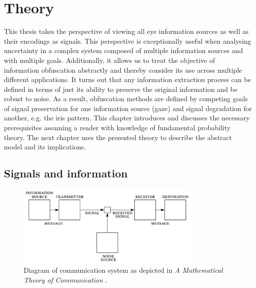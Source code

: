 \chapter{Theory}
This thesis takes the perspective of viewing all eye information sources as well as their encodings as signals. This perspective is exceptionally useful when analysing uncertainty in a complex system composed of multiple information sources and with multiple goals. Additionally, it allows us to treat the objective of information obfuscation abstractly and thereby consider its use across multiple different applications. It turns out that any information extraction process can be defined in terms of just its ability to preserve the original information and be robust to noise. As a result, obfuscation methods are defined by competing goals of signal preservation for one information source (gaze) and signal degradation for another, e.g. the iris pattern. This chapter introduces and discusses the necessary prerequisites assuming a reader with knowledge of fundamental probability theory. The next chapter uses the presented theory to describe the abstract model and its implications.




\section{Signals and information}
\begin{figure}
    \centering
    \includegraphics[width=0.8\textwidth]{figures/theory/comm-model.png}
    \caption{Diagram of communication system as depicted in \textit{A Mathematical Theory of Communication} \parencite{shannon1948mathematical}.}
    \label{fig:comm-model}
\end{figure}

